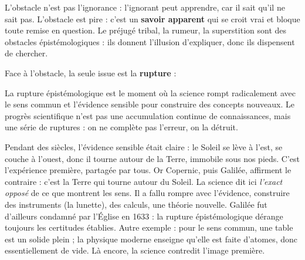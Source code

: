\documentclass[11pt]{article}
\newcommand{\cle}[1]{{\popxbold\color{popdark}#1}}
\begin{document}
L'obstacle n'est pas l'ignorance : l'ignorant peut apprendre, car il sait qu'il ne sait pas. L'obstacle est pire : c'est un \textbf{savoir apparent} qui se croit vrai et bloque toute remise en question. Le préjugé tribal, la rumeur, la superstition sont des obstacles épistémologiques : ils donnent l'illusion d'expliquer, donc ils dispensent de chercher.

Face à l'obstacle, la seule issue est la \textbf{rupture} :

\begin{definition}
La \cle{rupture épistémologique} est le moment où la science rompt radicalement avec le sens commun et l'évidence sensible pour construire des concepts nouveaux. Le progrès scientifique n'est pas une accumulation continue de connaissances, mais une série de ruptures : on ne complète pas l'erreur, on la détruit.
\end{definition}

\begin{exemplebox}
Pendant des siècles, l'évidence sensible était claire : le Soleil se lève à l'est, se couche à l'ouest, donc il tourne autour de la Terre, immobile sous nos pieds. C'est l'expérience première, partagée par tous. Or Copernic, puis Galilée, affirment le contraire : c'est la Terre qui tourne autour du Soleil. La science dit ici \emph{l'exact opposé} de ce que montrent les sens. Il a fallu rompre avec l'évidence, construire des instruments (la lunette), des calculs, une théorie nouvelle. Galilée fut d'ailleurs condamné par l'Église en 1633 : la rupture épistémologique dérange toujours les certitudes établies. Autre exemple : pour le sens commun, une table est un solide plein ; la physique moderne enseigne qu'elle est faite d'atomes, donc essentiellement de vide. Là encore, la science contredit l'image première.
\end{exemplebox}
\end{document}

